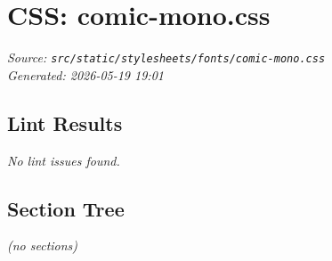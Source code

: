
\section*{CSS: comic-mono.css}
\textit{Source: \texttt{src/static/stylesheets/fonts/comic-mono.css}} \\
\textit{Generated: 2026-05-19 19:01} \\[0.5em]

\subsection*{Lint Results}
\textit{No lint issues found.} \\

\subsection*{Section Tree}

\noindent
\textit{(no sections)}
